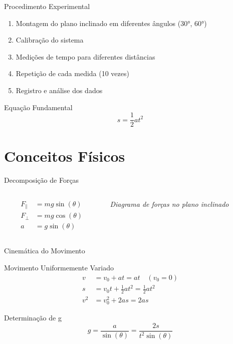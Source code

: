 \documentclass[12pt]{beamer}
\begin{document}
\begin{frame}{Procedimento Experimental}
    \begin{enumerate}
        \item Montagem do plano inclinado em diferentes ângulos (30°, 60°)
        \item Calibração do sistema
        \item Medições de tempo para diferentes distâncias
        \item Repetição de cada medida (10 vezes)
        \item Registro e análise dos dados
    \end{enumerate}

    \begin{block}{Equação Fundamental}
        $$s = \frac{1}{2}at^2$$
    \end{block}
\end{frame}

\section{Conceitos Físicos}

\begin{frame}{Decomposição de Forças}
    \begin{columns}
        \begin{column}{0.5\textwidth}
            \begin{align}
                F_{\parallel} & = mg \sin(\theta) \\
                F_{\perp}     & = mg \cos(\theta) \\
                a             & = g \sin(\theta)
            \end{align}
        \end{column}
        \begin{column}{0.5\textwidth}
            \begin{center}
                \textit{Diagrama de forças no plano inclinado}
            \end{center}
        \end{column}
    \end{columns}
\end{frame}

\begin{frame}{Cinemática do Movimento}
    \begin{block}{Movimento Uniformemente Variado}
        \begin{align}
            v   & = v_0 + at = at \quad (v_0 = 0)             \\
            s   & = v_0 t + \frac{1}{2}at^2 = \frac{1}{2}at^2 \\
            v^2 & = v_0^2 + 2as = 2as
        \end{align}
    \end{block}

    \begin{block}{Determinação de g}
        $$g = \frac{a}{\sin(\theta)} = \frac{2s}{t^2 \sin(\theta)}$$
    \end{block}
\end{frame}
\end{document}

